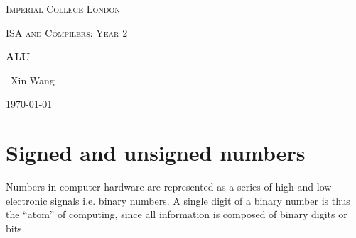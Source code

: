 \documentclass[10pt,a4paper]{article}
\begin{document}

\begin{titlepage}
	\centering
	{\scshape\LARGE Imperial College London \par}
	\vspace{1cm}
    {\scshape\Large ISA and Compilers: Year 2\par}
    \vspace{1.5cm}
	{\huge\bfseries ALU \par}
	\vspace{2cm}
	{\Large\ Xin Wang }
	\vfill
	{\large \today\par}
\end{titlepage}


\begin{abstract}
    Unlike other instruction architectures like the Mu0, the ALU is used in almost every instruction
    in the MIPS architecture from common arithmetic to address calculation. 

    MIPS architecture supports negative and positive arithmetic as well as floating numbers i.e.
    decimals so it is important to understand how the ALU enables those features. Also the following
    aspects need to be studied:
    \begin{itemize}
        \item What about fractions and other real numbers?
        \item What happens if an operation creates a number bigger than can be represented?
        \item How  does  hardware  really multiply or divide numbers?
    \end{itemize}
\end{abstract}


\tableofcontents
\pagebreak

\section{Signed and unsigned numbers}

Numbers in computer hardware are represented as a series of high and low electronic signals i.e.
binary numbers. A single digit of a binary number is thus the “atom” of computing, since all 
information is composed of binary digits or bits. 
\end{document}
